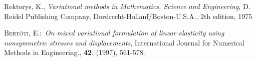 \clearpage
{}

\begin{thebibliography}{9}
Rektorys, K., \textit{Variational methods in Mathematics,
Science and Engineering}, D. Reidel Publishing Company,
Dordrecht-Hollanf/Boston-U.S.A., 2th edition, 1975

 \textsc{Bert\'{o}ti, E.}:\ \textit{On mixed variational formulation
of linear elasticity using nonsymmetric stresses and
displacements}, International Journal for Numerical Methods in
Engineering., \textbf{42}, (1997), 561-578.

\end{thebibliography}
